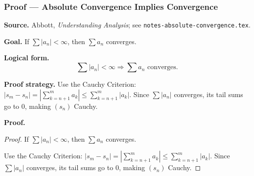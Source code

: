 
\clearpage
{}
\hypertarget{proof-RA-ABB-T-abs-conv-implies-conv}{}

\subsubsection[Absolute Convergence Implies Convergence]{Proof --- Absolute Convergence Implies Convergence}

\bigskip

\noindent
\textbf{Source.}
Abbott, \emph{Understanding Analysis}; see \texttt{notes-absolute-convergence.tex}.

\vspace{0.75em}

\noindent
\textbf{Goal.}
If $\sum |a_n| < \infty$, then $\sum a_n$ converges.

\vspace{0.75em}

\noindent
\textbf{Logical form.}
\[
  \sum |a_n| < \infty \Rightarrow \sum a_n \text{ converges}.
\]

\vspace{0.75em}

\noindent
\textbf{Proof strategy.}
Use the Cauchy Criterion: $|s_m - s_n| = |\sum_{k=n+1}^m a_k| \le \sum_{k=n+1}^m |a_k|$. Since $\sum |a_n|$ converges, its tail sums go to 0, making $(s_n)$ Cauchy.

\vspace{0.75em}

\noindent
\textbf{Proof.}
\begin{proof}
\Claim If $\sum |a_n| < \infty$, then $\sum a_n$ converges.

\Given 

\Goal 

\Strategy Use the Cauchy Criterion: $|s_m - s_n| = |\sum_{k=n+1}^m a_k| \le \sum_{k=n+1}^m |a_k|$. Since $\sum |a_n|$ converges, its tail sums go to 0, making $(s_n)$ Cauchy.

\medskip


\end{proof}


